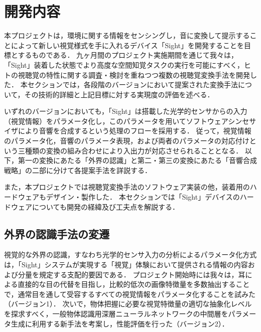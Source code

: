 \section{開発内容}

本プロジェクトは，環境に関する情報をセンシングし，音に変換して提示することによって新しい視覚様式を手に入れるデバイス「Sight」を開発することを目標とするものである．
九ヶ月間のプロジェクト実施期間を通じて我々は，「Sight」装着した状態でより高度な空間知覚タスクの実行を可能にすべく，ヒトの視聴覚の特性に関する調査・検討を重ねつつ複数の視聴覚変換手法を開発した．
本セクションでは，各段階のバージョンにおいて提案された変換手法について，その技術的詳細と上記目標に対する実現度の評価を述べる．

いずれのバージョンにおいても，「Sight」は搭載した光学的センサからの入力（視覚情報）をパラメータ化し，このパラメータを用いてソフトウェアシンセサイザにより音響を合成するという処理のフローを採用する．
従って，視覚情報のパラメータ化，音響のパラメータ表現，および両者のパラメータの対応付けという三種類の変換の組み合わせにより入出力が対応させられることとなる．
以下，第一の変換にあたる「外界の認識」と第二・第三の変換にあたる「音響合成戦略」の二部に分けて各提案手法を詳説する．

また，本プロジェクトでは視聴覚変換手法のソフトウェア実装の他，装着用のハードウェアもデザイン・製作した．
本セクションでは「Sight」デバイスのハードウェアについても開発の経緯及び工夫点を解説する．


\subsection{外界の認識手法の変遷}

視覚的な外界の認識，すなわち光学的センサ入力の分析によるパラメータ化方式は，「Sight」システムが実現する「視覚」体験において提供される情報の内容および分量を規定する支配的要因である．
プロジェクト開始時には我々は，耳による直接的な目の代替を目指し，比較的低次の画像特徴量を多数抽出することで，通常目を通して受容するすべての視覚情報をパラメータ化することを試みた（バージョン1）．
次いで，物体把握に必要な視覚特徴量の適切な抽象化レベルを探求すべく，一般物体認識用深層ニューラルネットワークの中間層をパラメータ生成に利用する新手法を考案し，性能評価を行った（バージョン2）．

